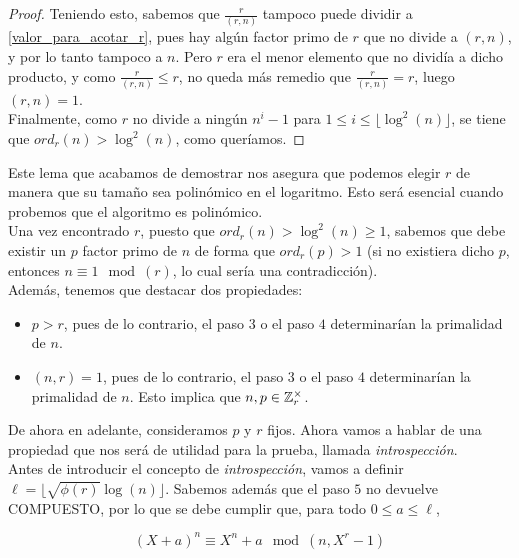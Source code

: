 \begin{proof}
	Teniendo esto, sabemos que $\frac{r}{(r, n)}$ tampoco puede dividir a \eqref{valor_para_acotar_r}, pues hay algún factor primo de $r$ que no divide a $(r, n)$, y por lo tanto tampoco a $n$. Pero $r$ era el menor elemento que no dividía a dicho producto, y como $\frac{r}{(r, n)} \leq r$, no queda más remedio que $\frac{r}{(r, n)} = r$, luego $(r, n) = 1$.\\
	
	Finalmente, como $r$ no divide a ningún $n^i - 1$ para $1 \leq i \leq \lfloor \log^2(n) \rfloor$, se tiene que $ord_r(n) > \log^2(n)$, como queríamos.
\end{proof}

Este lema que acabamos de demostrar nos asegura que podemos elegir $r$ de manera que su tamaño sea polinómico en el logaritmo. Esto será esencial cuando probemos que el algoritmo es polinómico.\\

Una vez encontrado $r$, puesto que $ord_r(n) > \log^2(n) \geq 1$, sabemos que debe existir un $p$ factor primo de $n$ de forma que $ord_r(p) > 1$ (si no existiera dicho $p$, entonces $n \equiv 1 \mod(r)$, lo cual sería una contradicción).\\

Además, tenemos que destacar dos propiedades:

\begin{itemize}
	\item $p > r$, pues de lo contrario, el paso $3$ o el paso $4$ determinarían la primalidad de $n$.
	
	\item $(n, r) = 1$, pues de lo contrario, el paso $3$ o el paso $4$ determinarían la primalidad de $n$. Esto implica que $n, p \in \mathbb{Z}_r^\times$.
\end{itemize}

De ahora en adelante, consideramos $p$ y $r$ fijos. Ahora vamos a hablar de una propiedad que nos será de utilidad para la prueba, llamada \textit{introspección}.\\

Antes de introducir el concepto de \textit{introspección}, vamos a definir $\ell = \lfloor \sqrt{\phi(r)}\log(n) \rfloor$. Sabemos además que el paso $5$ no devuelve COMPUESTO, por lo que se debe cumplir que, para todo $0 \leq a \leq \ell$,

\begin{equation}\label{identidad_con_polinomio_introspeccion}
(X + a)^n \equiv X^n + a \mod(n, X^r - 1)
\end{equation}

